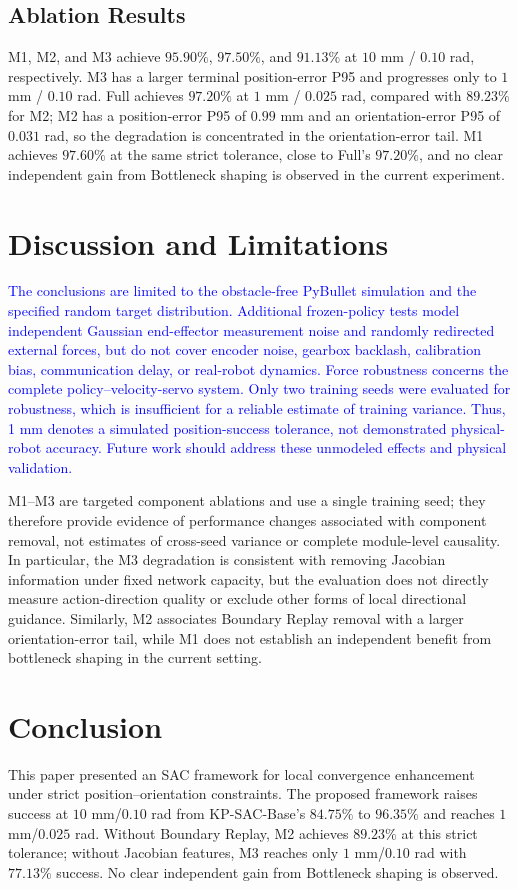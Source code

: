 \documentclass[conference]{IEEEtran}
\begin{document}
\subsection{Ablation Results}
M1, M2, and M3 achieve $95.90\%$, $97.50\%$, and $91.13\%$ at $10$ mm / $0.10$ rad, respectively. M3 has a larger terminal position-error P95 and progresses only to $1$ mm / $0.10$ rad. Full achieves $97.20\%$ at $1$ mm / $0.025$ rad, compared with $89.23\%$ for M2; M2 has a position-error P95 of $0.99$ mm and an orientation-error P95 of $0.031$ rad, so the degradation is concentrated in the orientation-error tail. M1 achieves $97.60\%$ at the same strict tolerance, close to Full's $97.20\%$, and no clear independent gain from Bottleneck shaping is observed in the current experiment.



\section{Discussion and Limitations}
\textcolor{blue}{The conclusions are limited to the obstacle-free PyBullet simulation and the specified random target distribution. Additional frozen-policy tests model independent Gaussian end-effector measurement noise and randomly redirected external forces, but do not cover encoder noise, gearbox backlash, calibration bias, communication delay, or real-robot dynamics. Force robustness concerns the complete policy--velocity-servo system. Only two training seeds were evaluated for robustness, which is insufficient for a reliable estimate of training variance. Thus, 1 mm denotes a simulated position-success tolerance, not demonstrated physical-robot accuracy. Future work should address these unmodeled effects and physical validation.}

M1--M3 are targeted component ablations and use a single training seed; they therefore provide evidence of performance changes associated with component removal, not estimates of cross-seed variance or complete module-level causality. In particular, the M3 degradation is consistent with removing Jacobian information under fixed network capacity, but the evaluation does not directly measure action-direction quality or exclude other forms of local directional guidance. Similarly, M2 associates Boundary Replay removal with a larger orientation-error tail, while M1 does not establish an independent benefit from bottleneck shaping in the current setting.

\section{Conclusion}
This paper presented an SAC framework for local convergence enhancement under strict position--orientation constraints. The proposed framework raises success at $10$ mm/$0.10$ rad from KP-SAC-Base's $84.75\%$ to $96.35\%$ and reaches $1$ mm/$0.025$ rad. Without Boundary Replay, M2 achieves $89.23\%$ at this strict tolerance; without Jacobian features, M3 reaches only $1$ mm/$0.10$ rad with $77.13\%$ success. No clear independent gain from Bottleneck shaping is observed.
\end{document}
